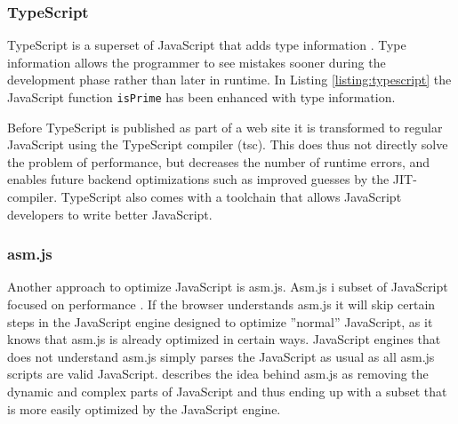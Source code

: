 \subsubsection{TypeScript}

TypeScript is a superset of JavaScript that adds type information \parencite{DeWolffHage2017}. Type information allows the programmer to see mistakes sooner during the development phase rather than later in runtime. In Listing \ref{listing:typescript} the JavaScript function \texttt{isPrime} has been enhanced with type information.



Before TypeScript is published as part of a web site it is transformed to regular JavaScript using the TypeScript compiler (tsc). This does thus not directly solve the problem of performance, but decreases the number of runtime errors, and enables future backend optimizations such as improved guesses by the JIT-compiler. TypeScript also comes with a toolchain that allows JavaScript developers to write better JavaScript.


\subsubsection{asm.js}

Another approach to optimize JavaScript is asm.js. Asm.js i subset of JavaScript focused on performance \parencite{Zakai2018}. If the browser understands asm.js it will skip certain steps in the JavaScript engine designed to optimize ''normal'' JavaScript, as it knows that asm.js is already optimized in certain ways. JavaScript engines that does not understand asm.js simply parses the JavaScript as usual as all asm.js scripts are valid JavaScript. \textcite{Zakai2018} describes the idea behind asm.js as removing the dynamic and complex parts of JavaScript and thus ending up with a subset that is more easily optimized by the JavaScript engine.


%

